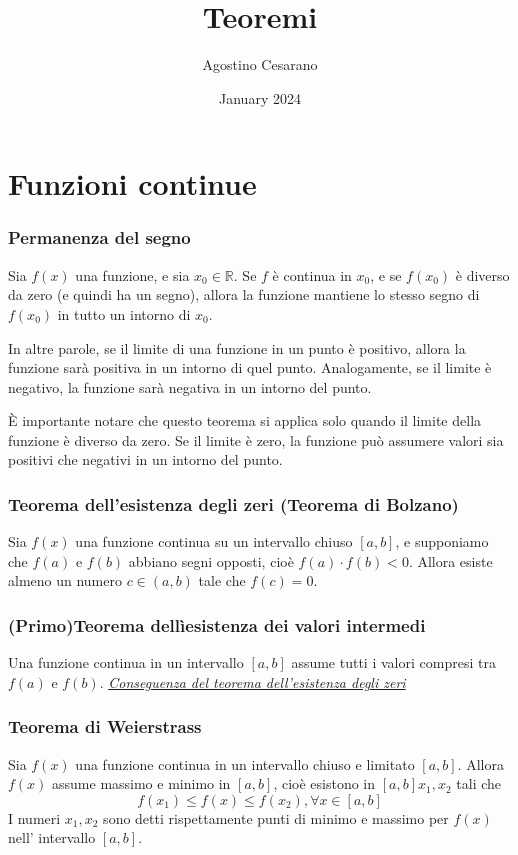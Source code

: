 \documentclass{article}
\title{Teoremi}
\author{Agostino Cesarano}
\date{January 2024}
\begin{document}
\maketitle
{}
\setcounter{part}{1}
\part{Funzioni continue}
\section{Permanenza del segno}
Sia $f(x)$ una funzione, e sia \(x_0 \in \mathbb{R}\). Se \(f\) è continua in \(x_0\), e se \(f(x_0)\) è diverso da zero (e quindi ha un segno), allora la funzione mantiene lo stesso segno di \(f(x_0)\) in tutto un intorno di \(x_0\).

In altre parole, se il limite di una funzione in un punto è positivo, allora la funzione sarà positiva in un intorno di quel punto. Analogamente, se il limite è negativo, la funzione sarà negativa in un intorno del punto.
\begin{calloutbox}
È importante notare che questo teorema si applica solo quando il limite della funzione è diverso da zero. Se il limite è zero, la funzione può assumere valori sia positivi che negativi in un intorno del punto. 
\end{calloutbox}
\section{Teorema dell'esistenza degli zeri (Teorema di Bolzano)}
Sia $f(x)$ una funzione continua su un intervallo chiuso \([a, b]\), e supponiamo che \(f(a)\) e \(f(b)\) abbiano segni opposti, cioè \(f(a) \cdot f(b) < 0\). Allora esiste almeno un numero \(c \in (a, b)\) tale che \(f(c) = 0\).
\section{(Primo)Teorema dellìesistenza dei valori intermedi}
Una funzione continua in un intervallo $[a,b]$ assume tutti i valori compresi tra $f(a)$ e $f(b)$. \underline{\textit {Conseguenza del teorema dell'esistenza degli zeri}}
\section{Teorema di Weierstrass}
Sia $f(x)$ una funzione continua in un intervallo chiuso e limitato $[a,b]$. Allora $f(x)$ assume massimo e minimo in $[a,b]$, cioè esistono in $[a,b] x_1,x_2$ tali che
$$f(x_1) \leq f(x) \leq f(x_2), \forall x \in [a,b]$$
I numeri $x_1, x_2$ sono detti rispettamente punti di minimo e massimo per $f(x)$ nell' intervallo $[a,b]$.
\end{document}
